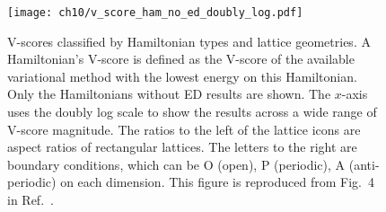 \begin{figure}[htb]
\centering
\texttt{[image: ch10/v\_score\_ham\_no\_ed\_doubly\_log.pdf]}
\caption[V-scores of different Hamiltonians]{
V-scores classified by Hamiltonian types and lattice geometries.
A Hamiltonian's V-score is defined as the V-score of the available variational method with the lowest energy on this Hamiltonian.
Only the Hamiltonians without ED results are shown.
The $x$-axis uses the doubly log scale to show the results across a wide range of V-score magnitude.
The ratios to the left of the lattice icons are aspect ratios of rectangular lattices. The letters to the right are boundary conditions, which can be O (open), P (periodic), A (anti-periodic) on each dimension.
This figure is reproduced from Fig.~4 in Ref.~\cite{wu2023variational}.
}
\label{fig:v-score-ham}
\end{figure}
